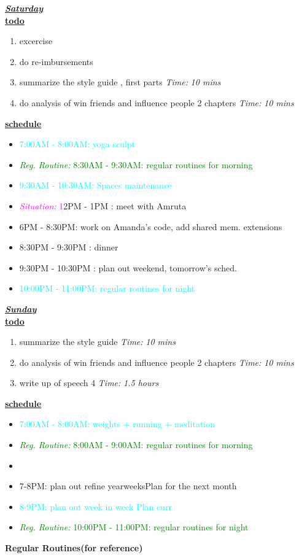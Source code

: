 \documentclass[11pt]{article}
\newcommand{\timeEst}[1]{\textit{Time:} \textit{#1}}
\newcommand{\regItem}[1]{\item \textcolor{cyan}{#1}}
\newcommand{\regRoutineItem}[1]{\item \textcolor{green}{\textit{Reg. Routine:} #1}}
\newcommand{\situationItem}[1]{\item \textcolor{magenta}{\textit{Situation:} #1}}
\begin{document}
\underline{\textbf{\textit{Saturday}}}\\
\underline{\textbf{todo}}\\
\begin{enumerate}
\item excercise
\item do re-imbursements
\item summarize the style guide , first parts \timeEst{10 mins}
\item do analysis of win friends and influence people 2 chapters \timeEst{10 mins}
\end{enumerate}

\underline{\textbf{schedule}}\\
\begin{itemize}
\regItem{7:00AM - 8:00AM: yoga sculpt}
\regRoutineItem {8:30AM - 9:30AM: regular routines for morning}
\regItem{9:30AM - 10:30AM: Spaces maintenance}
\situationItem 12PM - 1PM :  meet with Amruta
\item 6PM - 8:30PM: work on Amanda's code, add shared mem. extensions
\item 8:30PM - 9:30PM : dinner
\item 9:30PM - 10:30PM : plan out weekend, tomorrow's sched.
\regItem{10:00PM - 11:00PM: regular routines for night}
\end{itemize}

\underline{\textbf{\textit{Sunday}}}\\
\underline{\textbf{todo}}\\
\begin{enumerate}
\item summarize the style guide \timeEst{10 mins}
\item do analysis of win friends and influence people 2 chapters \timeEst{10 mins}
\item  write up of speech 4 \timeEst{1.5 hours}
\end{enumerate}


\underline{\textbf{schedule}}\\
\begin{itemize}
\regItem{7:00AM - 8:00AM: weights + running + meditation }
\regRoutineItem {8:00AM - 9:00AM: regular routines for morning}
\item
\item 7-8PM: plan out refine yearweeksPlan for the next month
\regItem{8-9PM:  plan out week in week Plan curr}
\regRoutineItem{10:00PM - 11:00PM: regular routines for night}
\end{itemize}

\newpage

\textbf{Regular Routines(for reference)}

\end{document}
